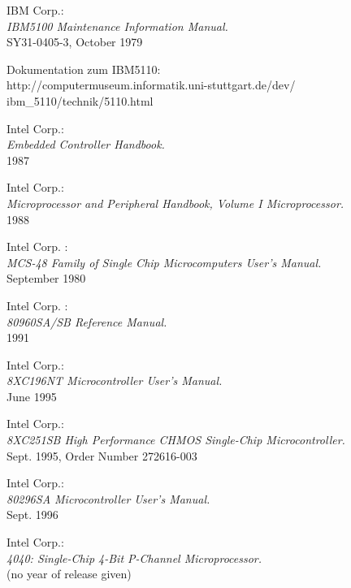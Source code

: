 IBM Corp.: \\
                 {\em IBM5100 Maintenance Information Manual.\/} \\
                 SY31-0405-3, October 1979

 Dokumentation zum IBM5110: \\
          http://computermuseum.informatik.uni-stuttgart.de/dev/ \\
          ibm\_5110/technik/5110.html

 Intel Corp.: \\
                 {\em Embedded Controller Handbook.\/} \\
		 1987

 Intel Corp.: \\
                 {\em Microprocessor and Peripheral Handbook, Volume I
                 Microprocessor.\/} \\
                 1988

  Intel Corp. : \\
                 {\em MCS-48 Family of Single Chip Microcomputers User's Manual.\/} \\
                 September 1980

 Intel Corp. : \\
                 {\em 80960SA/SB Reference Manual.\/} \\
                 1991

 Intel Corp.: \\
                 {\em 8XC196NT Microcontroller User's Manual.\/} \\
                 June 1995

 Intel Corp.: \\
                 {\em 8XC251SB High Performance CHMOS Single-Chip
                  Microcontroller.\/} \\
                 Sept. 1995, Order Number 272616-003

 Intel Corp.: \\
                 {\em 80296SA Microcontroller User's Manual.\/} \\
                 Sept. 1996

 Intel Corp.: \\
                  {\em 4040: Single-Chip 4-Bit P-Channel
                   Microprocessor.\/} \\
                  (no year of release given)

